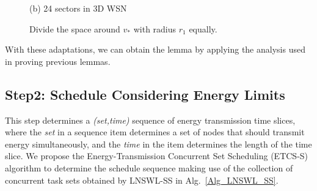 \documentclass[journal,10pt]{IEEEtran}
\begin{document}
\begin{IEEEproof}
\begin{figure}[htb]
{\begin{minipage}[c]{0.22\textwidth}
\parbox{\linewidth}{\centering\small{(b) 24 sectors in 3D WSN}}
\end{minipage}
}
\caption{Divide the space around $v_{*}$ with radius $r_1$ equally.}
\label{fig_spacearound_div}
\end{figure}

With these adaptations, we can obtain the lemma by applying the analysis used in proving previous lemmas.
\end{IEEEproof}

\subsection{Step2: Schedule Considering Energy Limits}

This step determines a \textit{(set,time)} sequence of energy transmission time slices, where the \textit{set} in a sequence item determines a set of nodes that should transmit energy simultaneously, and the \textit{time} in the item determines the length of the time slice. We propose the Energy-Transmission Concurrent Set Scheduling (ETCS-S) algorithm to determine the schedule sequence making use of the collection of concurrent task sets obtained by LNSWL-SS in Alg.~\ref{Alg_LNSWL_SS}.
\end{document}
